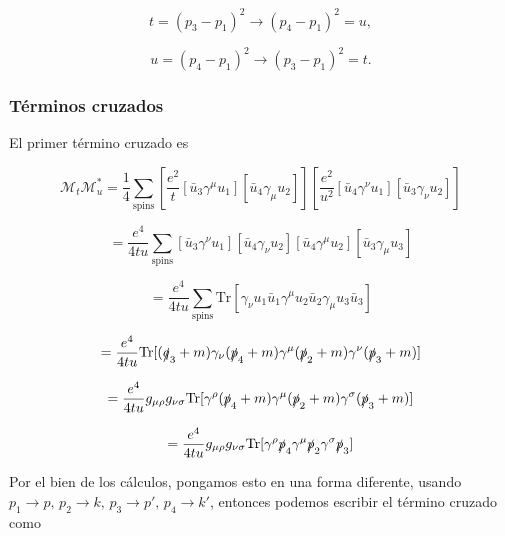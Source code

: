 \begin{equation}
t = (p_3 - p_1)^2 \rightarrow (p_4 - p_1)^2 = u,
\end{equation}

\begin{equation}
u = (p_4 - p_1)^2 \rightarrow (p_3 - p_1)^2 = t.
\end{equation}

\subsubsection{Términos cruzados}
El primer término cruzado es

\begin{equation}
\mathcal{M}_t \mathcal{M}_u^* = \frac{1}{4} \sum_{\text{spins}} \left[ \frac{e^2}{t} [\bar{u}_3 \gamma^\mu u_1] [\bar{u}_4 \gamma_\mu u_2] \right] \left[ \frac{e^2}{u^2} [\bar{u}_4 \gamma^\nu u_1] [\bar{u}_3 \gamma_\nu u_2] \right]
\end{equation}

\begin{equation}
= \frac{e^4}{4tu} \sum_{\text{spins}} [\bar{u}_3 \gamma^\nu u_1] [\bar{u}_4 \gamma_\nu u_2] [\bar{u}_4 \gamma^\mu u_2] [\bar{u}_3 \gamma_\mu u_3]
\end{equation}

\begin{equation}
= \frac{e^4}{4tu} \sum_{\text{spins}} \text{Tr}[\gamma_\nu u_1 \bar{u}_1 \gamma^\mu u_2 \bar{u}_2 \gamma_\mu u_3 \bar{u}_3]
\end{equation}

\begin{equation}
= \frac{e^4}{4tu} \text{Tr}[(\slashed{q}_3 + m) \gamma_\nu (\slashed{p}_4 + m)\gamma^\mu (\slashed{p}_2 + m)\gamma^\nu (\slashed{p}_3 + m)]
\end{equation}

\begin{equation}
= \frac{e^4}{4tu} g_{\mu \rho} g_{\nu \sigma} \text{Tr}[\gamma^\rho (\slashed{p}_4 + m) \gamma^\mu (\slashed{p}_2 + m) \gamma^\sigma (\slashed{p}_3 + m)]
\end{equation}

\begin{equation}
= \frac{e^4}{4tu} g_{\mu \rho} g_{\nu \sigma} \text{Tr}[\gamma^\rho \slashed{p}_4 \gamma^\mu \slashed{p}_2 \gamma^\sigma \slashed{p}_3 ]
\end{equation}

Por el bien de los cálculos, pongamos esto en una forma diferente, usando $ p_1 \to p, \, p_2 \to k,\, p_3 \to p', \, p_4 \to k' $, entonces podemos escribir el término cruzado como

